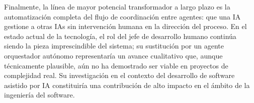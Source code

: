 Finalmente, la línea de mayor potencial transformador a largo plazo es la automatización completa del flujo de coordinación entre agentes: que una \ac{IA} gestione a otras \ac{IAs} sin intervención humana en la dirección del proceso. En el estado actual de la tecnología, el rol del jefe de desarrollo humano continúa siendo la pieza imprescindible del sistema; su sustitución por un agente orquestador autónomo representaría un avance cualitativo que, aunque técnicamente plausible, aún no ha demostrado ser viable en proyectos de complejidad real. Su investigación en el contexto del desarrollo de software asistido por \ac{IA} constituiría una contribución de alto impacto en el ámbito de la ingeniería del software.